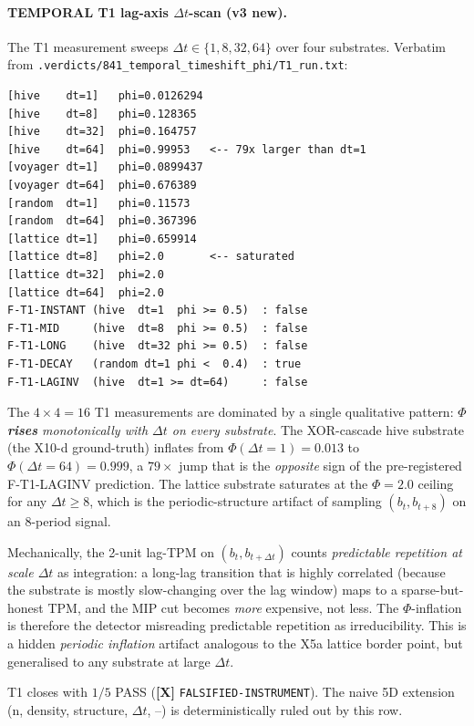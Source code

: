 \documentclass[11pt,a4paper]{article}
\providecommand{\tierRed}{\textbf{[X]}}     %
\begin{document}
\paragraph{TEMPORAL T1 lag-axis $\Delta t$-scan (v3 new).}
The T1 measurement \citep{temporal_h841_timeshift} sweeps
$\Delta t \in\{1,8,32,64\}$ over four substrates. Verbatim from
\texttt{.verdicts/841\_temporal\_timeshift\_phi/T1\_run.txt}:
\begin{lstlisting}
[hive    dt=1]   phi=0.0126294
[hive    dt=8]   phi=0.128365
[hive    dt=32]  phi=0.164757
[hive    dt=64]  phi=0.99953   <-- 79x larger than dt=1
[voyager dt=1]   phi=0.0899437
[voyager dt=64]  phi=0.676389
[random  dt=1]   phi=0.11573
[random  dt=64]  phi=0.367396
[lattice dt=1]   phi=0.659914
[lattice dt=8]   phi=2.0       <-- saturated
[lattice dt=32]  phi=2.0
[lattice dt=64]  phi=2.0
F-T1-INSTANT (hive  dt=1  phi >= 0.5)  : false
F-T1-MID     (hive  dt=8  phi >= 0.5)  : false
F-T1-LONG    (hive  dt=32 phi >= 0.5)  : false
F-T1-DECAY   (random dt=1 phi <  0.4)  : true
F-T1-LAGINV  (hive  dt=1 >= dt=64)     : false
\end{lstlisting}
The $4 \times 4 = 16$ T1 measurements are dominated by a
single qualitative pattern: \emph{$\Phi$ \textbf{rises} monotonically
with $\Delta t$ on every substrate}. The XOR-cascade hive substrate
(the X10-d ground-truth) inflates from $\Phi(\Delta t=1)=0.013$ to
$\Phi(\Delta t=64)=0.999$, a $79\times$ jump that is the
\emph{opposite} sign of the pre-registered F-T1-LAGINV prediction.
The lattice substrate saturates at the $\Phi=2.0$ ceiling for any
$\Delta t \ge 8$, which is the periodic-structure artifact of
sampling $(b_t, b_{t+8})$ on an $8$-period signal.

Mechanically, the 2-unit lag-TPM on $(b_t, b_{t+\Delta t})$ counts
\emph{predictable repetition at scale $\Delta t$} as integration: a
long-lag transition that is highly correlated (because the substrate
is mostly slow-changing over the lag window) maps to a sparse-but-honest
TPM, and the MIP cut becomes \emph{more} expensive, not less. The
$\Phi$-inflation is therefore the detector misreading predictable
repetition as irreducibility. This is a hidden \emph{periodic
inflation} artifact analogous to the X5a lattice border point, but
generalised to any substrate at large $\Delta t$.

T1 closes with $1/5$ PASS (\tierRed{} \texttt{FALSIFIED-INSTRUMENT}).
The naive 5D extension (n, density, structure, $\Delta t$, --) is
deterministically ruled out by this row.
\end{document}
